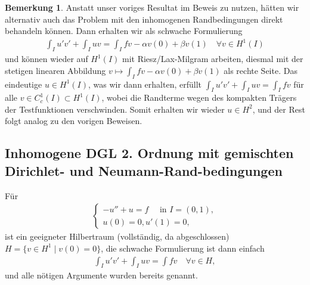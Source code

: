 \documentclass[twoside]{article}
\theoremstyle{definition}
\newtheorem{remark}[theorem]{Bemerkung}
\begin{document}
\begin{remark}
Anstatt unser voriges Resultat im Beweis zu nutzen, hätten wir alternativ auch das Problem mit den inhomogenen Randbedingungen direkt behandeln können. Dann erhalten wir als schwache Formulierung
\begin{align*}
\int_I u' v' + \int_I uv = \int_I fv - \alpha v(0) + \beta v(1) \quad \forall v \in H^1(I)
\end{align*}
und können wieder auf $H^1(I)$ mit Riesz/Lax-Milgram arbeiten, diesmal mit der stetigen linearen Abbildung $v \mapsto  \int_I fv - \alpha v(0) + \beta v(1)$ als rechte Seite. Das eindeutige $u \in H^1(I)$, was wir dann erhalten, erfüllt $\int_I u' v' + \int_I uv = \int_I fv$ für alle $v \in C_c^1(I) \subset H^1(I)$, wobei die Randterme wegen des kompakten Trägers der Testfunktionen verschwinden. Somit erhalten wir wieder $u \in H^2$, und der Rest folgt analog zu den vorigen Beweisen.
\end{remark}
\subsection{Inhomogene DGL 2. Ordnung mit gemischten Dirichlet- und Neumann-Rand-bedingungen}
Für 
\begin{align}
\begin{cases}
-u'' + u = f \quad \text{ in } I = (0,1),\\
u(0)=0, u'(1)=0,
\end{cases} \label{eq:gem}
\end{align}
ist ein geeigneter Hilbertraum (vollständig, da abgeschlossen) $H = \{v \in H^1 \; | \; v(0)=0 \}$, die schwache Formulierung ist dann einfach
\begin{align*}
\int_I u' v' + \int_I u v = \int f v \quad \forall v \in H,
\end{align*}
und alle nötigen Argumente wurden bereits genannt.
\end{document}
